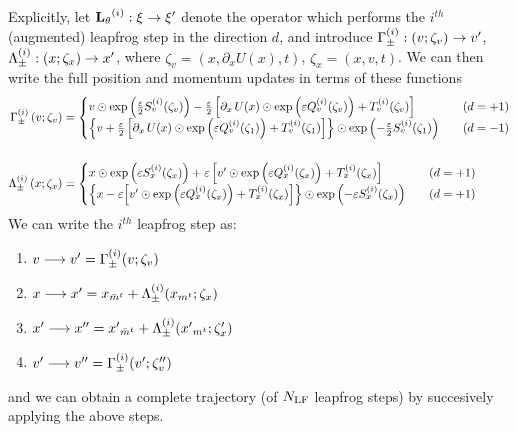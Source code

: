 Explicitly, let \({\mathbf{L}_{\theta}}^{(i)}: \xi \rightarrow {\xi^{\prime}}\) denote the operator which performs
the \(i^{th}\) (augmented) leapfrog step in the direction \(d\), and introduce
\(\Gamma_{\pm}^{(i)}: \left(v; \zeta_{v}\right) \rightarrow {v^{\prime}}\),
\(\Lambda_{\pm}^{(i)}: \left(x; \zeta_{x}\right)\rightarrow {x^{\prime}}\),
%
where \(\zeta_{v} = (x, \partial_{x}U(x), t)\), \(\zeta_{x} = (x, v, t)\).
%
We can then write the full position and momentum updates in terms of these
functions
%
\begin{align}
  \Gamma_{\pm}^{(i)}\left(v; \zeta_{v}\right) %
    &= \begin{cases}%
      v \odot \exp{\left(\frac{\eps}{2}\Svi(\zeta_{v})\right)}%
        - \frac{\eps}{2}\left[\partial_{x}\,U(x)\odot \exp{\left(\eps
            \Qvi(\zeta_{v})\right)}%
        + \Tvi(\zeta_{v})\right]
        &\quad (d = + 1)\\
      \left\{v + \frac{\eps}{2}\left[\partial_{x}\,U(x)\odot
          \exp{\left(\eps \Qvi(\zeta_{1})\right)}%
            + \Tvi(\zeta_{1})\right]\right\} \odot
            \exp{\left(-\frac{\eps}{2}\Svi(\zeta_{1})\right)}
      &\quad (d = - 1)
    \end{cases}\\
    &\quad \nonumber \\
  \Lambda_{\pm}^{(i)}\left(x; \zeta_{x}\right) %
    &= \begin{cases}%
      x \odot \exp{\left(\eps
        \Sxi(\zeta_{x})\right)}%
        + \eps\left[\vp\odot\exp{\left(\eps \Qxi(\zeta_{x})\right)} 
        + \Txi(\zeta_{x})\right]%
      &\quad (d = + 1) \\
      \left\{x - \eps{\left[\vp\odot\exp{\left(\eps \Qxi(\zeta_{x})\right)}%
          + \Txi(\zeta_{x})\right]}\right\}\odot \exp{\left(-\eps
          \Sxi(\zeta_{x})\right)}%
      &\quad (d = + 1)
  \end{cases}\\
\end{align}
%
We can write the \(i^{th}\) leapfrog step as:
%
\begin{enumerate}
  \item \(v \longrightarrow {v^{\prime}} = \Gamma_{\pm}^{(i)}(v; \zeta_{v})\)
  \item \(x \longrightarrow {x^{\prime}} = x_{\bar{m}^{t}} +
    \Lambda_{\pm}^{(i)}(x_{m^{t}}; \zeta_{x})\)
  \item \({x^{\prime}} \longrightarrow {x^{\prime\prime}} = {x^{\prime}}_{\bar{m}^{t}} +
    \Lambda_{\pm}^{(i)}({x^{\prime}}_{m^{t}}; \zeta_{x}^{\prime})\)
  \item \({v^{\prime}} \longrightarrow {v^{\prime\prime}} = \Gamma_{\pm}^{(i)}({v^{\prime}}; \zeta_{v}^{\prime\prime})\)
\end{enumerate}
%
and we can obtain a complete trajectory (of \({N_{\mathrm{LF}}}\) leapfrog steps) by
succesively applying the above steps.
%
